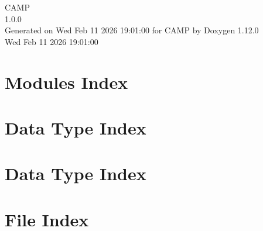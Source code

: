 \documentclass[twoside]{book}
\newcommand{\+}{\discretionary{\mbox{\scriptsize$\hookleftarrow$}}{}{}}
\newcommand{\clearemptydoublepage}{%
    \newpage{\pagestyle{empty}\cleardoublepage}%
  }
\begin{document}
  \raggedbottom
    \hypersetup{pageanchor=false,
                bookmarksnumbered=true,
                pdfencoding=unicode
               }
  \begin{titlepage}
  \vspace*{7cm}
  \begin{center}%
  {\Large CAMP}\\
  [1ex]\large 1.\+0.\+0 \\
  \vspace*{1cm}
  {\large Generated on Wed Feb 11 2026 19\+:01\+:00 for CAMP by Doxygen 1.12.0}\\
    \vspace*{0.5cm}
    {\small Wed Feb 11 2026 19:01:00}
  \end{center}
  \end{titlepage}
  \clearemptydoublepage
  \tableofcontents
  \clearemptydoublepage
  \hypersetup{pageanchor=true}















\chapter{Modules Index}

\chapter{Data Type Index}

\chapter{Data Type Index}

\chapter{File Index}

\end{document}
